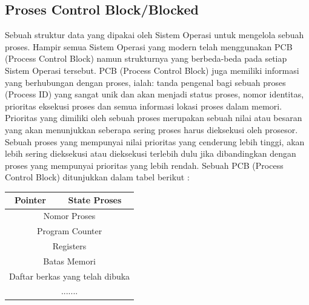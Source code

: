 	\subsection{Proses Control Block/Blocked}
	Sebuah struktur data yang dipakai oleh Sistem Operasi untuk mengelola sebuah proses. Hampir semua Sistem Operasi yang modern telah menggunakan PCB (Process Control Block) namun strukturnya yang berbeda-beda pada setiap Sistem Operasi tersebut. PCB (Process Control Block) juga memiliki informasi yang berhubungan dengan proses, ialah: tanda pengenal bagi sebuah proses (Process ID) yang sangat unik dan akan menjadi status proses, nomor identitas, prioritas eksekusi proses dan semua informasi lokasi proses dalam memori. Prioritas yang dimiliki oleh sebuah proses merupakan sebuah nilai atau besaran yang akan menunjukkan seberapa sering proses harus dieksekusi oleh prosesor. Sebuah proses yang mempunyai nilai prioritas yang cenderung lebih tinggi, akan lebih sering dieksekusi atau dieksekusi terlebih dulu jika dibandingkan dengan proses yang mempunyai prioritas yang lebih rendah.
	Sebuah PCB (Process Control Block) ditunjukkan dalam tabel berikut : 
	
	\begin{table}[H]
		\begin{tabular}{|c|c|}
			\hline
			Pointer & State Proses\\
			\hline
			\multicolumn{2}{|c|}{Nomor Proses}\\
			\hline
			\multicolumn{2}{|c|}{Program Counter}\\
			\hline
			\multicolumn{2}{|c|}{Registers}\\
			\hline
			\multicolumn{2}{|c|}{Batas Memori}\\
			\hline
			\multicolumn{2}{|c|}{Daftar berkas yang telah dibuka}\\
			\hline
			\multicolumn{2}{|c|}{.......}\\
		\end{tabular}
	\end{table}
	
